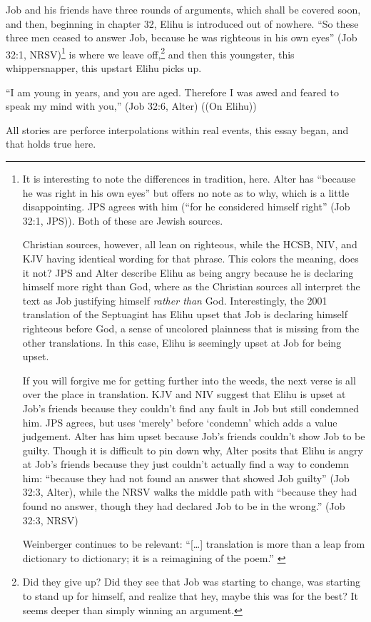 Job and his friends have three rounds of arguments, which shall be covered soon, and then, beginning in chapter 32, Elihu is introduced out of nowhere. ``So these three men ceased to answer Job, because he was righteous in his own eyes'' (Job 32:1, NRSV)\footnote{It is interesting to note the differences in tradition, here. Alter has ``because he was right in his own eyes'' but offers no note as to why, which is a little disappointing. JPS agrees with him (``for he considered himself right'' (Job 32:1, JPS)). Both of these are Jewish sources.

Christian sources, however, all lean on righteous, while the HCSB, NIV, and KJV having identical wording for that phrase. This colors the meaning, does it not? JPS and Alter describe Elihu as being angry because he is declaring himself more right than God, where as the Christian sources all interpret the text as Job justifying himself \emph{rather than} God. Interestingly, the 2001 translation of the Septuagint has Elihu upset that Job is declaring himself righteous before God, a sense of uncolored plainness that is missing from the other translations. In this case, Elihu is seemingly upset at Job for being upset.\footnotemark

If you will forgive me for getting further into the weeds, the next verse is all over the place in translation. KJV and NIV suggest that Elihu is upset at Job's friends because they couldn't find any fault in Job but still condemned him. JPS agrees, but uses `merely' before `condemn' which adds a value judgement. Alter has him upset because Job's friends couldn't show Job to be guilty. Though it is difficult to pin down why, Alter posits that Elihu is angry at Job's friends because they just couldn't actually find a way to condemn him: ``because they had not found an answer that showed Job guilty'' (Job 32:3, Alter), while the NRSV walks the middle path with ``because they had found no answer, though they had declared Job to be in the wrong.'' (Job 32:3, NRSV)

Weinberger continues to be relevant: ``{[}\ldots{]} translation is more than a leap from dictionary to dictionary; it is a reimagining of the poem.'' \parencite[46]{wangwei}} is where we leave off,\footnote{Did they give up? Did they see that Job was starting to change, was starting to stand up for himself, and realize that hey, maybe this was for the best? It seems deeper than simply winning an argument.} and then this youngster, this whippersnapper, this upstart Elihu picks up.

``I am young in years, and you are aged. Therefore I was awed and feared to speak my mind with you,'' (Job 32:6, Alter)
((On Elihu))

All stories are perforce interpolations within real events, this essay began, and that holds true here.

